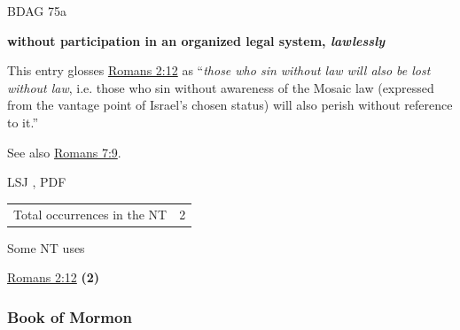 				\begin{compactdesc}
					\item[BDAG 75a] \textbf{}
						\begin{compactitem}
							\item \textbf{without participation in an organized legal system, \textit{lawlessly}}
								\begin{compactitem}
									\item This entry glosses \hyperref[ROMANS-2-12]{Romans 2:12} as ``\textit{those who sin without law will also be lost without law}, i.e. those who sin without awareness of the Mosaic law (expressed from the vantage point of Israel's chosen status) will also perish without reference to it.''
									\item See also \hyperref[ROMANS-7-9]{Romans 7:9}.
								\end{compactitem}
						\end{compactitem}
					\item[LSJ , PDF ] \textbf{}
						\begin{compactitem}
							\item 
						\end{compactitem}
				\end{compactdesc}
				
				\begin{tabular}{ll}
					Total occurrences in the NT & 2
				\end{tabular}
				
				\begin{compactdesc}
					\item[Some NT uses] \textbf{}
						\begin{compactdesc}
							\item[{\hyperref[ROMANS-2-12]{Romans 2:12}}] \textbf{(2)}
						\end{compactdesc}
				\end{compactdesc}
		
	\subsubsection{Book of Mormon} %
		\label{LAW-BOM}
	
		
